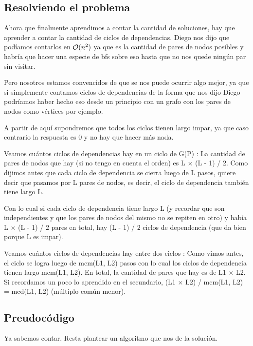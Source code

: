 \subsection{Resolviendo el problema}
	Ahora que finalmente aprendimos a contar la cantidad de soluciones, hay que aprender a contar la cantidad de ciclos de dependencias. Diego nos dijo que podíamos contarlos en $\mathcal{O}(n^{2})$ ya que es la cantidad de pares de nodos posibles y habría que hacer una especie de bfs sobre eso hasta que no nos quede ningún par sin visitar. \newline

	Pero nosotros estamos convencidos de que se nos puede ocurrir algo mejor, ya que si simplemente contamos ciclos de dependencias de la forma que nos dijo Diego podríamos haber hecho eso desde un principio con un grafo con los pares de nodos como vértices por ejemplo. \newline

	A partir de aquí supondremos que todos los ciclos tienen largo impar, ya que caso contrario la respuesta es 0 y no hay que hacer más nada. \newline

	Veamos cuántos ciclos de dependencias hay en un ciclo de G(P) : La cantidad de pares de nodos que hay (si no tengo en cuenta el orden) es L $\times$ (L - 1) / 2. Como dijimos antes que cada ciclo de dependencia se cierra luego de L pasos, quiere decir que pasamos por L pares de nodos, es decir, el ciclo de dependencia también tiene largo L. \newline  

	Con lo cual si cada ciclo de dependencia tiene largo L (y recordar que son independientes y que los pares de nodos del mismo no se repiten en otro) y había L $\times$ (L - 1) / 2 pares en total, hay (L - 1) / 2 ciclos de dependencia (que da bien porque L es impar).

	Veamos cuántos ciclos de dependencias hay entre dos ciclos : Como vimos antes, el ciclo se logra luego de mcm(L1, L2) pasos con lo cual los ciclos de dependencia tienen largo mcm(L1, L2). En total, la cantidad de pares que hay es de L1 $\times$ L2. Si recordamos un poco lo aprendido en el secundario, (L1 $\times$ L2) / mcm(L1, L2) = mcd(L1, L2) (múltiplo común menor). \newline


\subsection{Preudocódigo}
	Ya sabemos contar. Resta plantear un algoritmo que nos de la solución.

